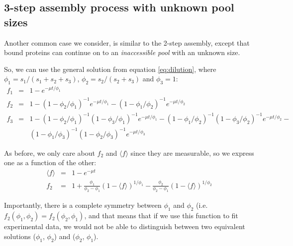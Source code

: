 \documentclass{article}
\newcommand{\fin}{\ensuremath{\langle f \rangle}}
\begin{document}
\subsection{3-step assembly process with unknown pool sizes}
Another common case we consider, is similar to the 2-step assembly, except that bound proteins can continue on to an \textit{inaccessible pool} with an unknown size.

So, we can use the general solution from equation \ref{eq:dilution}, where $\phi_1 = s_1 / (s_1 + s_2 + s_3)$, $\phi_2 = s_2 / (s_2 + s_3)$ and $\phi_3 = 1$:
\begin{eqnarray}
    f_1 &=& 1 - e^{- \mu t / \phi_1} \nonumber\\
    f_2 &=& 1 - \left(1 - \phi_2 / \phi_1 \right)^{-1} e^{- \mu t / \phi_1} - \left(1 - \phi_1 / \phi_2 \right)^{-1} e^{- \mu t / \phi_2} \nonumber\\
    f_3 &=& 1 - \left(1 - \phi_2 / \phi_1 \right)^{-1} \left(1 - \phi_3 / \phi_1 \right)^{-1} e^{- \mu t / \phi_1} - \left(1 - \phi_1 / \phi_2 \right)^{-1} \left(1 - \phi_3 / \phi_2 \right)^{-1} e^{- \mu t / \phi_2} - \nonumber\\
    && \left(1 - \phi_1 / \phi_3 \right)^{-1} \left(1 - \phi_2 / \phi_3 \right)^{-1} e^{- \mu t / \phi_3}
\end{eqnarray}

As before, we only care about $f_2$ and $\fin$ since they are measurable, so we express one as a function of the other:
\begin{eqnarray}
    \fin &=& 1 - e^{- \mu t}\nonumber\\
    f_2 &=& 1 + \frac{\phi_1}{\phi_2 - \phi_1} (1 - \fin)^{1/{\phi_1}} - \frac{\phi_2}{\phi_2-\phi_1} (1 - \fin)^{1/{\phi_2}} \label{eq:three_step_f2}
\end{eqnarray}

Importantly, there is a complete symmetry between $\phi_1$ and $\phi_2$ (i.e. $f_2(\phi_1, \phi_2) = f_2(\phi_2, \phi_1)$, and that means that if we use this function to fit experimental data, we would not be able to distinguish between two equivalent solutions ($\phi_1$, $\phi_2$) and ($\phi_2$, $\phi_1$).
\end{document}

